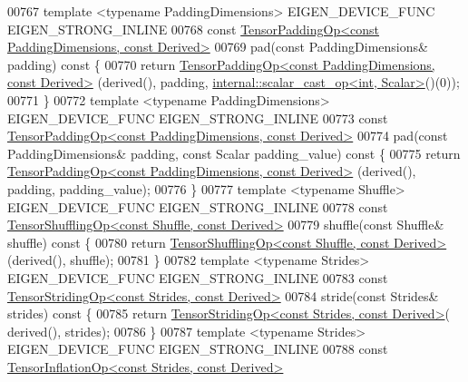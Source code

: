 \begin{DoxyCode}
00767     \textcolor{keyword}{template} <\textcolor{keyword}{typename} PaddingDimensions> EIGEN\_DEVICE\_FUNC EIGEN\_STRONG\_INLINE
00768     \textcolor{keyword}{const} \hyperlink{class_eigen_1_1_tensor_padding_op}{TensorPaddingOp<const PaddingDimensions, const Derived>}
00769     pad(\textcolor{keyword}{const} PaddingDimensions& padding)\textcolor{keyword}{ const }\{
00770       \textcolor{keywordflow}{return} \hyperlink{class_eigen_1_1_tensor_padding_op}{TensorPaddingOp<const PaddingDimensions, const Derived>}
      (derived(), padding, \hyperlink{struct_eigen_1_1internal_1_1scalar__cast__op}{internal::scalar\_cast\_op<int, Scalar>}()(0));
00771     \}
00772     \textcolor{keyword}{template} <\textcolor{keyword}{typename} PaddingDimensions> EIGEN\_DEVICE\_FUNC EIGEN\_STRONG\_INLINE
00773     \textcolor{keyword}{const} \hyperlink{class_eigen_1_1_tensor_padding_op}{TensorPaddingOp<const PaddingDimensions, const Derived>}
00774     pad(\textcolor{keyword}{const} PaddingDimensions& padding, \textcolor{keyword}{const} Scalar padding\_value)\textcolor{keyword}{ const }\{
00775       \textcolor{keywordflow}{return} \hyperlink{class_eigen_1_1_tensor_padding_op}{TensorPaddingOp<const PaddingDimensions, const Derived>}
      (derived(), padding, padding\_value);
00776     \}
00777     \textcolor{keyword}{template} <\textcolor{keyword}{typename} Shuffle> EIGEN\_DEVICE\_FUNC EIGEN\_STRONG\_INLINE
00778     \textcolor{keyword}{const} \hyperlink{class_eigen_1_1_tensor_shuffling_op}{TensorShufflingOp<const Shuffle, const Derived>}
00779     shuffle(\textcolor{keyword}{const} Shuffle& shuffle)\textcolor{keyword}{ const }\{
00780       \textcolor{keywordflow}{return} \hyperlink{class_eigen_1_1_tensor_shuffling_op}{TensorShufflingOp<const Shuffle, const Derived>}
      (derived(), shuffle);
00781     \}
00782     \textcolor{keyword}{template} <\textcolor{keyword}{typename} Str\textcolor{keywordtype}{id}es> EIGEN\_DEVICE\_FUNC EIGEN\_STRONG\_INLINE
00783     \textcolor{keyword}{const} \hyperlink{class_eigen_1_1_tensor_striding_op}{TensorStridingOp<const Strides, const Derived>}
00784     stride(\textcolor{keyword}{const} Strides& strides)\textcolor{keyword}{ const }\{
00785       \textcolor{keywordflow}{return} \hyperlink{class_eigen_1_1_tensor_striding_op}{TensorStridingOp<const Strides, const Derived>}(
      derived(), strides);
00786     \}
00787     \textcolor{keyword}{template} <\textcolor{keyword}{typename} Str\textcolor{keywordtype}{id}es> EIGEN\_DEVICE\_FUNC EIGEN\_STRONG\_INLINE
00788     \textcolor{keyword}{const} \hyperlink{class_eigen_1_1_tensor_inflation_op}{TensorInflationOp<const Strides, const Derived>}

\end{DoxyCode}
